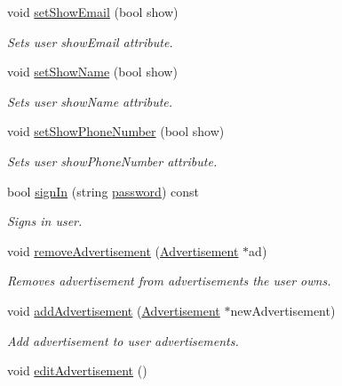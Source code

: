 \begin{DoxyCompactItemize}
void \hyperlink{class_user_af2c1c491ccbb27dcf3426b8ab89841d5}{set\+Show\+Email} (bool show)
\begin{DoxyCompactList}\small\item\em Sets user show\+Email attribute. \end{DoxyCompactList}\item 
void \hyperlink{class_user_a655b1a3e4d1877a8cddb9a3d874c2844}{set\+Show\+Name} (bool show)
\begin{DoxyCompactList}\small\item\em Sets user show\+Name attribute. \end{DoxyCompactList}\item 
void \hyperlink{class_user_ae8606e0f992f391088af95a80aeaef07}{set\+Show\+Phone\+Number} (bool show)
\begin{DoxyCompactList}\small\item\em Sets user show\+Phone\+Number attribute. \end{DoxyCompactList}\item 
bool \hyperlink{class_user_af75d18fdc45ac9fba9911815b78b7daa}{sign\+In} (string \hyperlink{class_user_ab537b9a55bc7d7fcafcdf8e53d085e67}{password}) const 
\begin{DoxyCompactList}\small\item\em Signs in user. \end{DoxyCompactList}\item 
void \hyperlink{class_user_a62c158d18b404de5fa049358c2a64a85}{remove\+Advertisement} (\hyperlink{class_advertisement}{Advertisement} $\ast$ad)
\begin{DoxyCompactList}\small\item\em Removes advertisement from advertisements the user owns. \end{DoxyCompactList}\item 
void \hyperlink{class_user_a7ac881e0b18256f2aa5bc58616994965}{add\+Advertisement} (\hyperlink{class_advertisement}{Advertisement} $\ast$new\+Advertisement)
\begin{DoxyCompactList}\small\item\em Add advertisement to user advertisements. \end{DoxyCompactList}\item 
\hypertarget{class_user_a7f9f8c64216df27994ffe53960d2d18a}{}void \hyperlink{class_user_a7f9f8c64216df27994ffe53960d2d18a}{edit\+Advertisement} ()\label{class_user_a7f9f8c64216df27994ffe53960d2d18a}


\end{DoxyCompactItemize}
